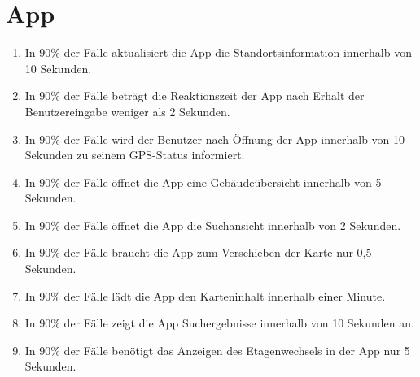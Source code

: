 \section{App}

\begin{enumerate}
    \item In 90\% der Fälle aktualisiert die App die Standortsinformation innerhalb von 10 Sekunden.
    \item In 90\% der Fälle beträgt die Reaktionszeit der App nach Erhalt der Benutzereingabe weniger als 2 Sekunden.
    \item In 90\% der Fälle wird der Benutzer nach Öffnung der App innerhalb von 10 Sekunden zu seinem GPS-Status informiert.
    \item In 90\% der Fälle öffnet die App eine Gebäudeübersicht innerhalb von 5 Sekunden.
    \item In 90\% der Fälle öffnet die App die Suchansicht innerhalb von 2 Sekunden.
    \item In 90\% der Fälle braucht die App zum Verschieben der Karte nur 0,5 Sekunden.
    \item In 90\% der Fälle lädt die App den Karteninhalt innerhalb einer Minute.
    \item In 90\% der Fälle zeigt die App Suchergebnisse innerhalb von 10 Sekunden an.
    \item In 90\% der Fälle benötigt das Anzeigen des Etagenwechsels in der App nur 5 Sekunden.
\end{enumerate}